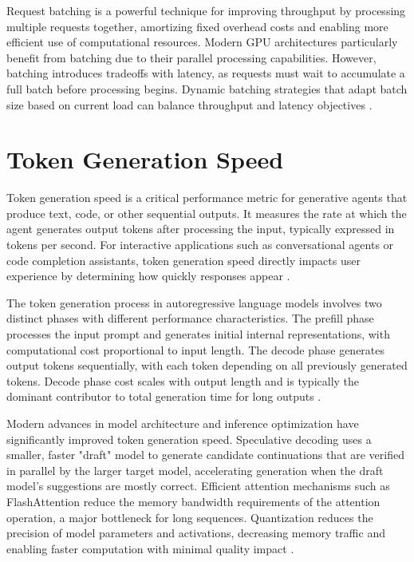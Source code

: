 \begin{TNtwocol}
Request batching is a powerful technique for improving throughput by processing multiple requests together, amortizing fixed overhead costs and enabling more efficient use of computational resources. Modern GPU architectures particularly benefit from batching due to their parallel processing capabilities. However, batching introduces tradeoffs with latency, as requests must wait to accumulate a full batch before processing begins. Dynamic batching strategies that adapt batch size based on current load can balance throughput and latency objectives \cite{langchain2024,getmaximai2024,shahrad2020}.

\section{Token Generation Speed}
Token generation speed is a critical performance metric for generative agents that produce text, code, or other sequential outputs. It measures the rate at which the agent generates output tokens after processing the input, typically expressed in tokens per second. For interactive applications such as conversational agents or code completion assistants, token generation speed directly impacts user experience by determining how quickly responses appear \cite{pope2023}.

The token generation process in autoregressive language models involves two distinct phases with different performance characteristics. The prefill phase processes the input prompt and generates initial internal representations, with computational cost proportional to input length. The decode phase generates output tokens sequentially, with each token depending on all previously generated tokens. Decode phase cost scales with output length and is typically the dominant contributor to total generation time for long outputs \cite{pope2023}.

Modern advances in model architecture and inference optimization have significantly improved token generation speed. Speculative decoding uses a smaller, faster "draft" model to generate candidate continuations that are verified in parallel by the larger target model, accelerating generation when the draft model's suggestions are mostly correct. Efficient attention mechanisms such as FlashAttention reduce the memory bandwidth requirements of the attention operation, a major bottleneck for long sequences. Quantization reduces the precision of model parameters and activations, decreasing memory traffic and enabling faster computation with minimal quality impact \cite{pope2023,pope2023}.


\end{TNtwocol}

